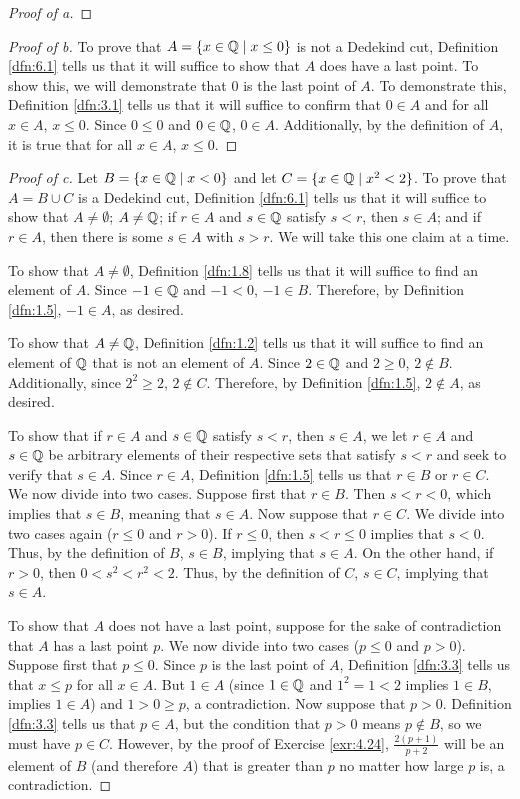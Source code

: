 \documentclass[../main.tex]{subfiles}
\begin{document}
\begin{exercise}
\begin{proof}[Proof of a]
    \end{proof}
    \begin{proof}[Proof of b]
        To prove that $A=\{x\in\mathbb{Q}\mid x\leq 0\}$ is not a Dedekind cut, Definition \ref{dfn:6.1} tells us that it will suffice to show that $A$ does have a last point. To show this, we will demonstrate that 0 is the last point of $A$. To demonstrate this, Definition \ref{dfn:3.1} tells us that it will suffice to confirm that $0\in A$ and for all $x\in A$, $x\leq 0$. Since $0\leq 0$ and $0\in\mathbb{Q}$, $0\in A$. Additionally, by the definition of $A$, it is true that for all $x\in A$, $x\leq 0$.
    \end{proof}
    \begin{proof}[Proof of c]
        Let $B=\{x\in\mathbb{Q}\mid x<0\}$ and let $C=\{x\in\mathbb{Q}\mid x^2<2\}$. To prove that $A=B\cup C$ is a Dedekind cut, Definition \ref{dfn:6.1} tells us that it will suffice to show that $A\neq\emptyset$; $A\neq\mathbb{Q}$; if $r\in A$ and $s\in\mathbb{Q}$ satisfy $s<r$, then $s\in A$; and if $r\in A$, then there is some $s\in A$ with $s>r$. We will take this one claim at a time.\par
        To show that $A\neq\emptyset$, Definition \ref{dfn:1.8} tells us that it will suffice to find an element of $A$. Since $-1\in\mathbb{Q}$ and $-1<0$, $-1\in B$. Therefore, by Definition \ref{dfn:1.5}, $-1\in A$, as desired.\par
        To show that $A\neq\mathbb{Q}$, Definition \ref{dfn:1.2} tells us that it will suffice to find an element of $\mathbb{Q}$ that is not an element of $A$. Since $2\in\mathbb{Q}$ and $2\geq 0$, $2\notin B$. Additionally, since $2^2\geq 2$, $2\notin C$. Therefore, by Definition \ref{dfn:1.5}, $2\notin A$, as desired.\par
        To show that if $r\in A$ and $s\in\mathbb{Q}$ satisfy $s<r$, then $s\in A$, we let $r\in A$ and $s\in\mathbb{Q}$ be arbitrary elements of their respective sets that satisfy $s<r$ and seek to verify that $s\in A$. Since $r\in A$, Definition \ref{dfn:1.5} tells us that $r\in B$ or $r\in C$. We now divide into two cases. Suppose first that $r\in B$. Then $s<r<0$, which implies that $s\in B$, meaning that $s\in A$. Now suppose that $r\in C$. We divide into two cases again ($r\leq 0$ and $r>0$). If $r\leq 0$, then $s<r\leq 0$ implies that $s<0$. Thus, by the definition of $B$, $s\in B$, implying that $s\in A$. On the other hand, if $r>0$, then $0<s^2<r^2<2$. Thus, by the definition of $C$, $s\in C$, implying that $s\in A$.\par
        To show that $A$ does not have a last point, suppose for the sake of contradiction that $A$ has a last point $p$. We now divide into two cases ($p\leq 0$ and $p>0$). Suppose first that $p\leq 0$. Since $p$ is the last point of $A$, Definition \ref{dfn:3.3} tells us that $x\leq p$ for all $x\in A$. But $1\in A$ (since $1\in\mathbb{Q}$ and $1^2=1<2$ implies $1\in B$, implies $1\in A$) and $1>0\geq p$, a contradiction. Now suppose that $p>0$. Definition \ref{dfn:3.3} tells us that $p\in A$, but the condition that $p>0$ means $p\notin B$, so we must have $p\in C$. However, by the proof of Exercise \ref{exr:4.24}, $\frac{2(p+1)}{p+2}$ will be an element of $B$ (and therefore $A$) that is greater than $p$ no matter how large $p$ is, a contradiction.

\end{proof}
\end{exercise}
\end{document}

